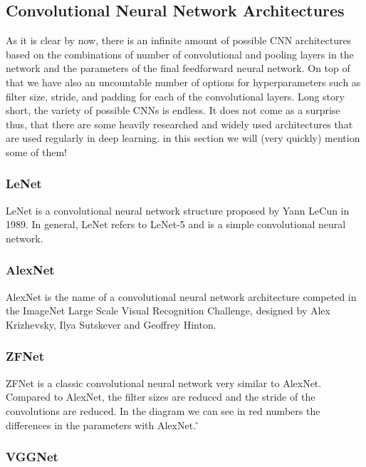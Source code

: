 \subsection{Convolutional Neural Network Architectures}

As it is clear by now, there is an infinite amount of possible CNN architectures based on the combinations of number
of convolutional and pooling layers in the network and the parameters of the final feedforward neural network. On top
of that we have also an uncountable number of options for hyperparameters such as filter size, stride, and padding
for each of the convolutional layers. Long story short, the variety of possible CNNs is endless. It does not come as
a surprise thus, that there are some heavily researched and widely used architectures that are used regularly in deep
learning. in this section we will (very quickly) mention some of them!

\subsubsection{LeNet}

LeNet is a convolutional neural network structure proposed by Yann LeCun in 1989. In general, LeNet refers to LeNet-5
and is a simple convolutional neural network.


\subsubsection{AlexNet}

AlexNet is the name of a convolutional neural network architecture competed in the ImageNet Large Scale Visual
Recognition Challenge, designed by Alex Krizhevsky, Ilya Sutskever and Geoffrey Hinton.


\subsubsection{ZFNet}

ZFNet is a classic convolutional neural network very similar to AlexNet. Compared to AlexNet, the filter sizes are
reduced and the stride of the convolutions are reduced. In the diagram we can see in red numbers the differences in
the parameters with AlexNet. \v


\subsubsection{VGGNet}

